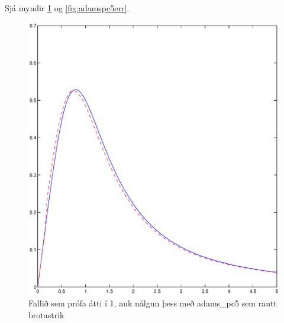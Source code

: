 \documentclass[a4]{article}
\begin{document}
\subsection{}


Sjá myndir \ref{fig:adamspc5plot} og \ref{fig:adamspc5err}.
\begin{figure}[]
  \begin{center}
    \includegraphics[scale=0.5]{adamspc5plot.eps}
  \end{center}
  \caption{Fallið sem prófa átti í 1, auk nálgun þess með adams\_pc5 sem rautt brotastrik}
  \label{fig:adamspc5plot}
\end{figure}
\end{document}
